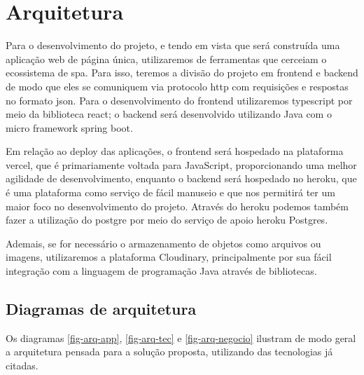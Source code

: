 \section{Arquitetura}
Para o desenvolvimento do projeto, e tendo em vista que será construída uma aplicação web de página única, utilizaremos de ferramentas que cerceiam o ecossistema de \ac{spa}. Para isso, teremos a divisão do projeto em \gls{frontend} e \gls{backend} de modo que eles se comuniquem via protocolo \ac{http} com requisições e respostas no formato \ac{json}. Para o desenvolvimento do \gls{frontend} utilizaremos \gls{typescript} por meio da biblioteca \gls{react}; o \gls{backend} será desenvolvido utilizando Java com o micro \gls{framework} \gls{spring boot}. %

Em relação ao \gls{deploy} das aplicações, o \gls{frontend} será hospedado na plataforma \gls{vercel}, que é primariamente voltada para JavaScript, proporcionando uma melhor agilidade de desenvolvimento, enquanto o \gls{backend} será hospedado no \gls{heroku}, que é uma plataforma como serviço de fácil manuseio e que nos permitirá ter um maior foco no desenvolvimento do projeto. Através do \gls{heroku} podemos também fazer a utilização do \gls{postgre} por meio do serviço de apoio \gls{heroku} Postgres.

Ademais, se for necessário o armazenamento de objetos como arquivos ou imagens, utilizaremos a plataforma Cloudinary, principalmente por sua fácil integração com a linguagem de programação Java através de bibliotecas.

\subsection{Diagramas de arquitetura}
Os diagramas \autoref{fig-arq-app}, \autoref{fig-arq-tec} e \autoref{fig-arq-negocio} ilustram de modo geral a arquitetura pensada para a solução proposta, utilizando das tecnologias já citadas.

